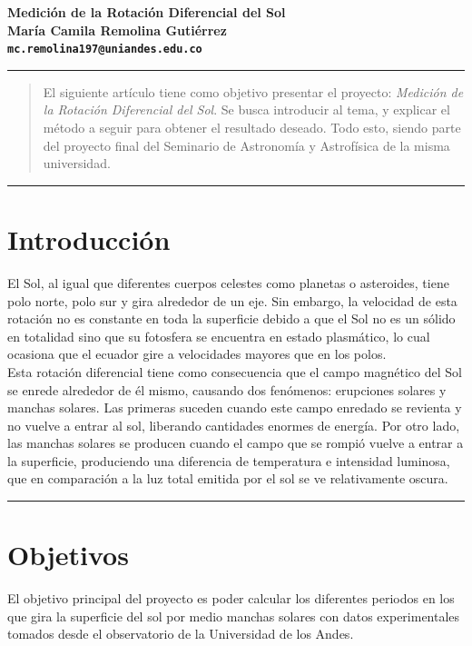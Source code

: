 \documentclass[11pt,letterpaper]{article}
\begin{document}
\begin{center}
{{\huge \textbf{Medición de la Rotación Diferencial del Sol} \\ 
\singlespacing 
{\large \textbf{María Camila Remolina Gutiérrez\\ 
\normalsize 
\texttt{mc.remolina197@uniandes.edu.co}\\
 }}}}
\end{center}

\hrule

\begin{abstract}
El siguiente artículo tiene como objetivo presentar el proyecto: \textit{Medición de la Rotación Diferencial del Sol}. Se busca introducir al tema, y explicar el método a seguir para obtener el resultado deseado. Todo esto, siendo parte del proyecto final del Seminario de Astronomía y Astrofísica de la misma universidad. \\
\end{abstract}

\hrule

\section{Introducción}
El Sol, al igual que diferentes cuerpos celestes como planetas o asteroides, tiene polo norte, polo sur y gira alrededor de un eje. Sin embargo, la velocidad de esta rotación no es constante en toda la superficie debido a que el Sol no es un sólido en totalidad sino que su fotosfera se encuentra en estado plasmático, lo cual ocasiona que el ecuador gire a velocidades mayores que en los polos. 
\\

Esta rotación diferencial tiene como consecuencia que el campo magnético del Sol se enrede alrededor de él mismo, causando dos fenómenos: erupciones solares y manchas solares. Las primeras suceden cuando este campo enredado se revienta y no vuelve a entrar al sol, liberando cantidades enormes de energía. Por otro lado, las manchas solares se producen cuando el campo que se rompió vuelve a entrar a la superficie, produciendo una diferencia de temperatura e intensidad luminosa, que en comparación a la luz total emitida por el sol se ve relativamente oscura.
\\

\hrule

\section{Objetivos}
El objetivo principal del proyecto es poder calcular los diferentes periodos en los que gira la superficie del sol por medio manchas solares con datos experimentales tomados desde el observatorio de la Universidad de los Andes.\\
\end{document}
